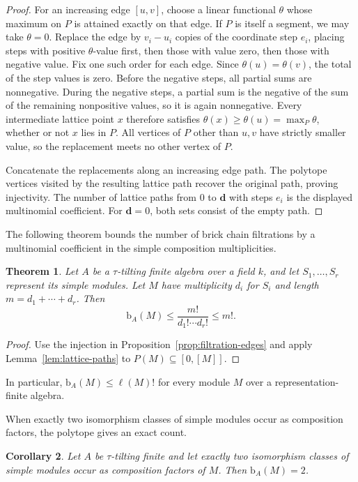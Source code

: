 \documentclass[a4paper,reqno,10pt]{amsart}
\newtheorem{theorem}{Theorem}[section]
\newtheorem{corollary}[theorem]{Corollary}
\theoremstyle{definition}
\numberwithin{equation}{section}
\newcommand{\bcount}{\mathrm b}
\begin{document}
\begin{proof}
For an increasing edge $[u,v]$, choose a linear functional $\theta$
whose maximum on $P$ is attained exactly on that edge. If $P$ is
itself a segment, we may take $\theta=0$.
Replace the edge by $v_i-u_i$ copies of the coordinate step $e_i$,
placing steps with positive $\theta$-value first, then those with value
zero, then those with negative value. Fix one such order for each edge.
Since $\theta(u)=\theta(v)$, the total of the step values is zero.
Before the negative steps, all partial sums are nonnegative.
During the negative steps, a partial sum is the negative of the sum
of the remaining nonpositive values, so it is again nonnegative.
Every intermediate lattice point $x$ therefore satisfies
$\theta(x)\geq\theta(u)=\max_P\theta$, whether or not $x$ lies in $P$.
All vertices of $P$ other than
$u,v$ have strictly smaller value, so the replacement meets no other
vertex of $P$.

Concatenate the replacements along an increasing edge path. The
polytope vertices visited by the resulting lattice path recover the
original path, proving injectivity. The number of lattice paths from
$0$ to $\mathbf d$ with steps $e_i$ is the displayed multinomial coefficient.
For $\mathbf d=0$, both sets consist of the empty path.
\end{proof}

The following theorem bounds the number of brick chain filtrations by
a multinomial coefficient in the simple composition multiplicities.

\begin{theorem}\label{thm:multinomial}
Let $A$ be a $\tau$-tilting finite algebra over a field $k$, and let
$S_1,\ldots,S_r$ represent its simple modules. Let $M$ have multiplicity
$d_i$ for $S_i$ and length $m=d_1+\cdots+d_r$. Then
\[
 \bcount_A(M)\leq\frac{m!}{d_1!\cdots d_r!}\leq m!.
\]
\end{theorem}

\begin{proof}
Use the injection in Proposition~\ref{prop:filtration-edges} and apply
Lemma~\ref{lem:lattice-paths} to $P(M)\subseteq[0,[M]]$.
\end{proof}

In particular, $\bcount_A(M)\leq\ell(M)!$ for every module $M$ over a
representation-finite algebra.

When exactly two isomorphism classes of simple modules occur as
composition factors, the polytope gives an exact count.

\begin{corollary}\label{cor:two-simple-count}
Let $A$ be $\tau$-tilting finite and let exactly two isomorphism
classes of simple modules occur as composition factors of $M$. Then $\bcount_A(M)=2$.
\end{corollary}
\end{document}
